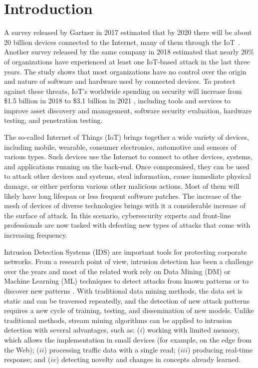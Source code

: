 \section{Introduction} 


\newcommand{\refminas}{\textit{Ref}\xspace}
\newcommand{\mfog}{\textit{MFOG}\xspace}
\newcommand{\iot}{IoT\xspace}
\newcommand{\nids}{NIDS\xspace}
\newcommand{\ds}{DS\xspace}


A survey released by Gartner in 2017 estimated that by 2020 there will be about 20 billion devices connected to the Internet, many of them through the IoT~\cite{gartner_forecast_2017}. Another survey released by the same company in 2018 estimated that nearly 20\% of organizations have experienced at least one IoT-based attack in the last three years. The study shows that most organizations have no control over the origin and nature of software and hardware used by connected devices.
To protect against these threats, IoT's worldwide  spending on security will increase from \$1.5 billion in 2018 to \$3.1 billion in 2021 \cite{gartner_it_glossary_2018}, including tools and services to improve asset discovery and management, software security evaluation, hardware testing, and penetration testing.

The so-called Internet of Things (IoT) brings together a wide variety of devices, including mobile, wearable, consumer electronics, automotive and sensors of various types.
Such devices use the Internet to connect to other devices, systems, and applications running on the back-end. Once compromised, they can be used to attack other devices and systems, steal information, cause immediate physical damage, or either perform various other malicious actions. Most of them will likely have long lifespan or less frequent software patches. The increase of the mesh of devices of diverse technologies brings with it a considerable increase of the surface of attack.
In this scenario, cybersecurity experts and front-line professionals are now tasked with defeating  new types of attacks that come with increasing frequency.

Intrusion Detection Systems (IDS) are important tools for protecting corporate networks. From a research point of view, intrusion detection has been a challenge
over the years and  most of the related work rely on Data Mining (DM) or Machine Learning (ML) techniques to detect attacks from known patterns or to discover new patterns \cite {buczak2016survey, mitchell2014survey}.
With  traditional data mining methods, the data set is static and can be traversed repeatedly, and the detection of new attack patterns requires a new cycle of training, testing, and dissemination of new models.
Unlike traditional methods, stream mining algorithms can be applied to intrusion detection with several advantages, such as: ($ i $) working with limited memory, which allows the implementation in small devices (for example, on the edge from the Web); ($ ii $) processing traffic data with a single read; ($ iii $) producing real-time response; and ($ iv $) detecting novelty and changes in concepts already learned.

